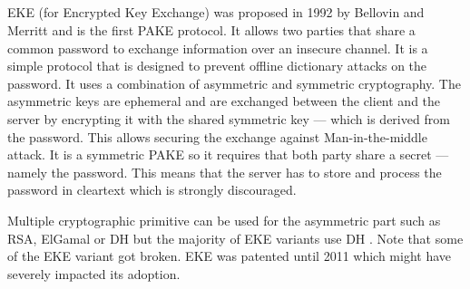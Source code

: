 ﻿\documentclass[../report.tex]{subfiles}
\begin{document}
\subsection{}
\paragraph{}
EKE (for Encrypted Key Exchange) was proposed in 1992 by Bellovin and Merritt \cite{EKE_Paper} and is the first PAKE protocol. 
It allows two parties that share a common password to exchange information over an insecure channel.
It is a simple protocol that is designed to prevent offline dictionary attacks on the password.
It uses a combination of asymmetric and symmetric cryptography.
The asymmetric keys are ephemeral and are exchanged between the client and the server by encrypting it with the shared symmetric key --- which is derived from the password.
This allows securing the exchange against Man-in-the-middle attack. %
It is a symmetric PAKE so it requires that both party share a secret --- namely the password. This means that the server has to store and process the password in cleartext which is strongly discouraged. %

Multiple cryptographic primitive can be used for the asymmetric part such as RSA, ElGamal or DH but the majority of EKE variants use DH \cite{Breaking_EKE}. %
Note that some of the EKE variant got broken. 
EKE was patented until 2011 which might have severely impacted its adoption.



\paragraph{}
\end{document}
